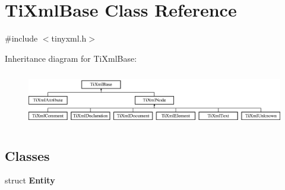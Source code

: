 \hypertarget{class_ti_xml_base}{
\section{\-Ti\-Xml\-Base \-Class \-Reference}
\label{class_ti_xml_base}
}


{\ttfamily \#include $<$tinyxml.\-h$>$}

\-Inheritance diagram for \-Ti\-Xml\-Base\-:\begin{figure}[H]
\begin{center}
\leavevmode
\includegraphics[height=2.413793cm]{class_ti_xml_base}
\end{center}
\end{figure}
\subsection*{\-Classes}
\begin{DoxyCompactItemize}
\item 
struct {\bfseries \-Entity}
\end{DoxyCompactItemize}
